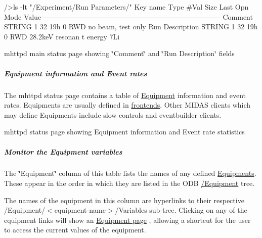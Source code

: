 \begin{DoxyCode}
/>ls -lt "/Experiment/Run Parameters/"
Key name                        Type    #Val  Size  Last Opn Mode Value
---------------------------------------------------------------------------
Comment                         STRING  1     32    19h  0   RWD   no beam, test 
      only
Run Description                 STRING  1     32    19h  0   RWD  28.2keV resonan
      t energy 7Li
\end{DoxyCode}


\par
 \begin{center} mhttpd main status page showing \char`\"{}Comment\char`\"{} and \char`\"{}Run Description\char`\"{} fields  \end{center}  \par


\par


\label{RC_mhttpd_status_page_features_idx_mhttpd_page_status_equipment}
\hypertarget{RC_mhttpd_status_page_features_idx_mhttpd_page_status_equipment}{}
 \hypertarget{RC_mhttpd_status_page_features_RC_mhttpd_status_Equipment_info}{}\subparagraph{Equipment information and Event rates}\label{RC_mhttpd_status_page_features_RC_mhttpd_status_Equipment_info}
The mhttpd status page contains a table of \hyperlink{FrontendOperation_FE_sw_equipment}{Equipment} information and event rates. Equipments are usually defined in \hyperlink{FrontendOperation_FE_features}{frontends}. Other MIDAS clients which may define Equipments include slow controls and eventbuilder clients.

\begin{center} mhttpd status page showing Equipment information and Event rate statistics  \end{center} \hypertarget{RC_mhttpd_status_page_features_RC_mhttpd_eq_variables}{}\subparagraph{Monitor the Equipment variables}\label{RC_mhttpd_status_page_features_RC_mhttpd_eq_variables}
The \char`\"{}Equipment\char`\"{} column of this table lists the names of any defined \hyperlink{FrontendOperation_FE_sw_equipment}{Equipments}. These appear in the order in which they are listed in the ODB \hyperlink{FE_ODB_equipment_tree}{/Equipment} tree.

The names of the equipment in this column are hyperlinks to their respective /Equipment/$<$equipment-\/name$>$/Variables sub-\/tree. Clicking on any of the equipment links will show an \hyperlink{RC_mhttpd_Equipment_page}{Equipment page} , allowing a shortcut for the user to access the current values of the equipment. \par


